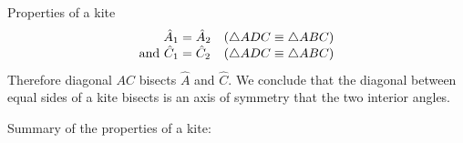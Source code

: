 \begin{wex}{Properties of a kite}
{
\begin{equation*}
  \begin{array}{r@{\;}l@{\quad}l}
    \hat{A}_{1} &= \hat{A}_{2} & \mbox{($\triangle ADC \equiv \triangle ABC$)} \\ 
    \mbox{and } \hat{C}_{1} &= \hat{C}_{2} &  \mbox{($\triangle ADC \equiv \triangle ABC$)}\\ 
  \end{array}
\end{equation*}
Therefore diagonal $AC$ bisects $\hat{A}$ and $\hat{C}$. We conclude
that the diagonal between equal sides of a kite bisects is an axis of symmetry that the two
interior angles.
}
\end{wex}


Summary of the properties of a kite:
